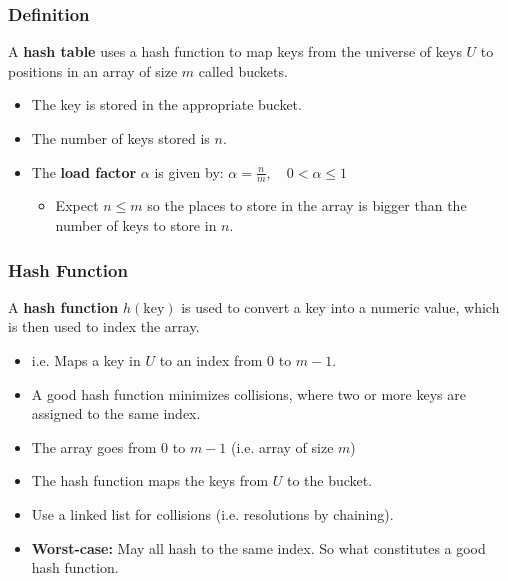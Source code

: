 \subsubsection{Definition}
\begin{definition}
A \textbf{hash table} uses a hash function to map keys from the universe of keys \( U \) to positions in an array of size \( m \) called buckets. 
\begin{itemize}
    \item The key is stored in the appropriate bucket. 
    \item The number of keys stored is \( n \).
    \item The \textbf{load factor} \( \alpha \) is given by: $\alpha = \frac{n}{m}, \quad 0 < \alpha \leq 1$
    \begin{itemize}
        \item Expect $n \leq m$ so the places to store in the array is bigger than the number of keys to store in $n$.
    \end{itemize}
\end{itemize}
\end{definition}

\subsubsection{Hash Function}
\begin{definition}
A \textbf{hash function} \( h(\text{key}) \) is used to convert a key into a numeric value, which is then used to index the array. 
\begin{itemize}
    \item i.e. Maps a key in $U$ to an index from $0$ to $m-1$.
    \item A good hash function minimizes collisions, where two or more keys are assigned to the same index.
\end{itemize}
\end{definition}

\begin{example}
    \begin{itemize}
        \item The array goes from $0$ to $m-1$ (i.e. array of size $m$)
        \item The hash function maps the keys from $U$ to the bucket.
        \item Use a linked list for collisions (i.e. resolutions by chaining).
        \item \textbf{Worst-case:} May all hash to the same index. So what constitutes a good hash function. 
    \end{itemize}
\end{example}

